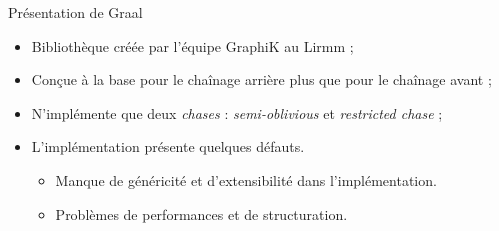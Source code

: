\begin{frame}{Présentation de Graal}
    \begin{itemize}
        \item Bibliothèque créée par l'équipe GraphiK au Lirmm ;
        \item Conçue à la base pour le chaînage arrière plus que pour le chaînage avant ;
        \item N'implémente que deux \textit{chases} : \textit{semi-oblivious} et \textit{restricted chase} ;
        \item L'implémentation présente quelques défauts.
            \begin{itemize}
                \item Manque de généricité et d'extensibilité dans l'implémentation.
                \item Problèmes de performances et de structuration.
            \end{itemize}
    \end{itemize}
\end{frame}